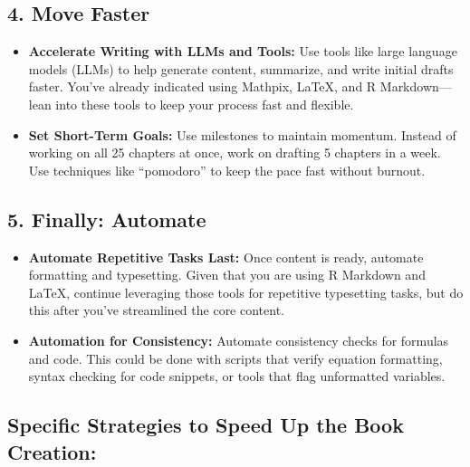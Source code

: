 \documentclass[
  12 pt,
  a4paper,
]{book}
\providecommand{\tightlist}{%
  \setlength{\itemsep}{0pt}\setlength{\parskip}{0pt}}
\numberwithin{equation}{section}
\theoremstyle{plain}      %
\theoremstyle{definition} %
\theoremstyle{remark}     %
\theoremstyle{note}         %
\begin{document}
\hypertarget{move-faster}{%
\subsection*{\texorpdfstring{4. \textbf{Move
Faster}}{4. Move Faster}}\label{move-faster}}

\begin{itemize}
\tightlist
\item
  \textbf{Accelerate Writing with LLMs and Tools:} Use tools like large
  language models (LLMs) to help generate content, summarize, and write
  initial drafts faster. You've already indicated using Mathpix, LaTeX,
  and R Markdown---lean into these tools to keep your process fast and
  flexible.
\item
  \textbf{Set Short-Term Goals:} Use milestones to maintain momentum.
  Instead of working on all 25 chapters at once, work on drafting 5
  chapters in a week. Use techniques like ``pomodoro'' to keep the pace
  fast without burnout.
\end{itemize}

\hypertarget{finally-automate}{%
\subsection*{\texorpdfstring{5. \textbf{Finally:
Automate}}{5. Finally: Automate}}\label{finally-automate}}

\begin{itemize}
\tightlist
\item
  \textbf{Automate Repetitive Tasks Last:} Once content is ready,
  automate formatting and typesetting. Given that you are using R
  Markdown and LaTeX, continue leveraging those tools for repetitive
  typesetting tasks, but do this after you've streamlined the core
  content.
\item
  \textbf{Automation for Consistency:} Automate consistency checks for
  formulas and code. This could be done with scripts that verify
  equation formatting, syntax checking for code snippets, or tools that
  flag unformatted variables.
\end{itemize}

\hypertarget{specific-strategies-to-speed-up-the-book-creation}{%
\subsection*{\texorpdfstring{\textbf{Specific Strategies to Speed Up the
Book
Creation:}}{Specific Strategies to Speed Up the Book Creation:}}\label{specific-strategies-to-speed-up-the-book-creation}}
\end{document}
